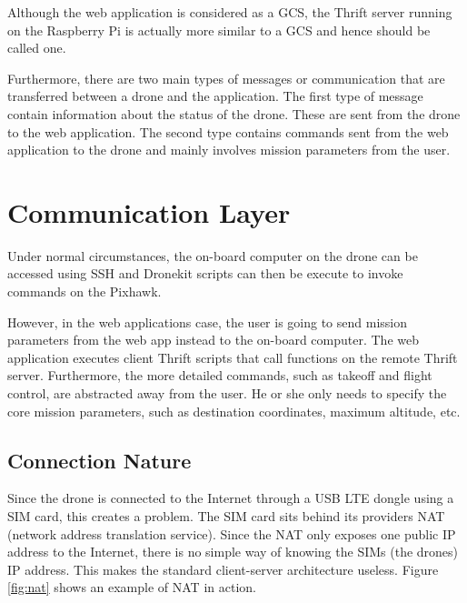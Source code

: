 Although the web application is considered as a GCS, the Thrift server running on the Raspberry Pi is actually more similar to a GCS and hence should be called one.

Furthermore, there are two main types of messages or communication that are transferred between a drone and the application. The first type of message contain information about the status of the drone. These are sent from the drone to the web application. The second type contains commands sent from the web application to the drone and mainly involves mission parameters from the user.





\section{Communication Layer}\label{sect:communicationlayer}
Under normal circumstances, the on-board computer on the drone can be accessed using SSH and Dronekit scripts can then be execute to invoke commands on the Pixhawk. 

However, in the web application\textquotesingle s case, the user is going to send mission parameters from the web app instead to the on-board computer. The web application executes client Thrift scripts that call functions on the remote Thrift server. Furthermore, the more detailed commands, such as takeoff and flight control, are abstracted away from the user. He or she only needs to specify the core mission parameters, such as destination coordinates, maximum altitude, etc.

\subsection{Connection Nature}
Since the drone is connected to the Internet through a USB LTE dongle using a SIM card, this creates a problem. The SIM card sits behind its provider\textquotesingle s NAT (network address translation service). Since the NAT only exposes one public IP address to the Internet, there is no simple way of knowing the SIM\textquotesingle s (the drone\textquotesingle s) IP address. This makes the standard client-server architecture useless. Figure \ref{fig:nat} shows an example of NAT in action.

